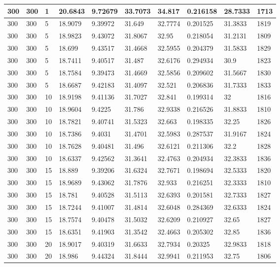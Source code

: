 \begin{landscape}
\begin{longtable}{ | l | l | l | l | l | l | l | l | l | l | }
300 & 300 & 1 & 20.6843 & 9.72679 & 33.7073 & 34.817 & 0.216158 & 28.7333 & 1713\\ \hline
300 & 300 & 5 & 18.9079 & 9.39972 & 31.649 & 32.7774 & 0.201525 & 31.3833 & 1819\\ \hline
300 & 300 & 5 & 18.9823 & 9.43072 & 31.8067 & 32.95 & 0.218054 & 31.2131 & 1809\\ \hline
300 & 300 & 5 & 18.699 & 9.43517 & 31.4668 & 32.5955 & 0.204379 & 31.5833 & 1829\\ \hline
300 & 300 & 5 & 18.7411 & 9.40517 & 31.487 & 32.6176 & 0.294934 & 30.9 & 1823\\ \hline
300 & 300 & 5 & 18.7584 & 9.39473 & 31.4669 & 32.5856 & 0.209602 & 31.5667 & 1830\\ \hline
300 & 300 & 5 & 18.6687 & 9.42183 & 31.4097 & 32.521 & 0.206836 & 31.7333 & 1833\\ \hline
300 & 300 & 10 & 18.9198 & 9.41136 & 31.7027 & 32.841 & 0.199314 & 32 & 1816\\ \hline
300 & 300 & 10 & 18.9604 & 9.4225 & 31.786 & 32.9338 & 0.216526 & 31.8833 & 1810\\ \hline
300 & 300 & 10 & 18.7821 & 9.40741 & 31.5323 & 32.663 & 0.198335 & 32.25 & 1826\\ \hline
300 & 300 & 10 & 18.7386 & 9.4031 & 31.4701 & 32.5983 & 0.287537 & 31.9167 & 1824\\ \hline
300 & 300 & 10 & 18.7628 & 9.40481 & 31.496 & 32.6121 & 0.211306 & 32.2 & 1828\\ \hline
300 & 300 & 10 & 18.6337 & 9.42562 & 31.3641 & 32.4763 & 0.204934 & 32.3833 & 1836\\ \hline
300 & 300 & 15 & 18.889 & 9.39206 & 31.6324 & 32.7671 & 0.198694 & 32.5333 & 1820\\ \hline
300 & 300 & 15 & 18.9689 & 9.43062 & 31.7876 & 32.933 & 0.216251 & 32.3333 & 1810\\ \hline
300 & 300 & 15 & 18.781 & 9.40528 & 31.5113 & 32.6393 & 0.201581 & 32.7333 & 1827\\ \hline
300 & 300 & 15 & 18.7244 & 9.41007 & 31.4814 & 32.6048 & 0.284369 & 32.6333 & 1824\\ \hline
300 & 300 & 15 & 18.7574 & 9.40478 & 31.5032 & 32.6209 & 0.210927 & 32.65 & 1827\\ \hline
300 & 300 & 15 & 18.6351 & 9.41903 & 31.3542 & 32.4663 & 0.205302 & 32.85 & 1836\\ \hline
300 & 300 & 20 & 18.9017 & 9.40319 & 31.6633 & 32.7934 & 0.20325 & 32.9833 & 1818\\ \hline
300 & 300 & 20 & 18.986 & 9.44324 & 31.8444 & 32.9941 & 0.211953 & 32.75 & 1806\\ \hline

\end{longtable}
\end{landscape}
